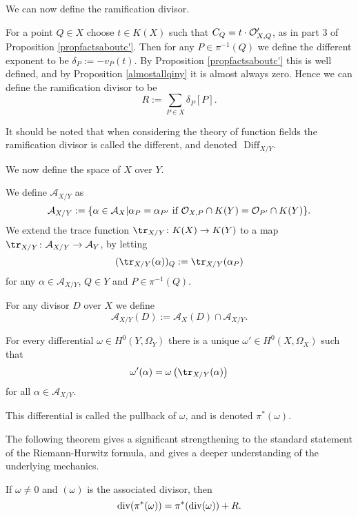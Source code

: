 We can now define the ramification divisor.


    \begin{defn}
    For a point $Q\in X$ choose $t\in K(X)$ such that $C_Q = t\cdot {\cal O}_{X,Q}'$, as in part 3 of Proposition \ref{propfactsaboutc'}.
    Then for any $P\in \pi^{-1}(Q)$ we define the different exponent to be $\delta_P := -v_P(t)$.
    By Proposition \ref{propfactsaboutc'} this is well defined, and by Proposition \ref{almostallqiny} it is almost always zero.
    Hence we can define the ramification divisor to be
        \[
        R := \sum_{P\in X} \delta_P [P].
        \]
    \end{defn}

    \begin{rem}
    It should be noted that when considering the theory of function fields the ramification divisor is called the different, and denoted $\text{ Diff}_{X/Y}$.
    \end{rem}

We now define the \adele space of $X$ over $Y$.

    \begin{defn}
    We define $\mathcal {A}_{X/Y}$ as
        \[
        \mathcal{A}_{X/Y} := \{\alpha \in \mathcal{A}_X | \alpha_P =\alpha_{P'}\ \text{if}\ {\cal O}_{X,P}\cap K(Y) = {\cal O}_{P'}\cap K(Y)\}.
        \]
    We extend the trace function $\tr_{X/Y}\colon K(X)\rightarrow K(Y)$ to a map $\tr_{X/Y}\colon \mathcal{A}_{X/Y} \rightarrow \mathcal{A}_Y$,  by letting
        \[
        (\tr_{X/Y}(\alpha))_Q := \tr_{X/Y}(\alpha_P)
        \]
    for any $\alpha \in \mathcal{A}_{X/Y}$, $Q\in Y$ and $P\in \pi^{-1}(Q)$.
    
    For any divisor $D$ over $X$ we define
        \[
        \mathcal{A}_{X/Y}(D) := \mathcal{A}_X(D) \cap \mathcal{A}_{X/Y}.
        \]
    
    \end{defn}


    \begin{defn}\label{theoremdetailedhurwitz}
    For every differential $\omega\in H^0(Y,\Omega_Y)$ there is a unique $\omega'\in H^0(X,\Omega_X)$ such that
        \[
        \omega'(\alpha) = \omega\left(\tr_{X/Y}(\alpha)\right)
        \]
    for all $\alpha \in {\mathcal A}_{X/Y}$.
    
    This differential is called the pullback of $\omega$, and is denoted $\pi^*(\omega)$. 
    \end{defn}

The following theorem gives a significant strengthening to the standard statement of the Riemann-Hurwitz formula, and gives a deeper understanding of the underlying mechanics.
    \begin{thm}
    If $\omega\neq 0$ and $(\omega)$ is the associated divisor, then 
        \[
        \operatorname{div} ( \pi^*(\omega)) = \pi^*(\operatorname{div}(\omega)) + R.
        \]
    \end{thm}

